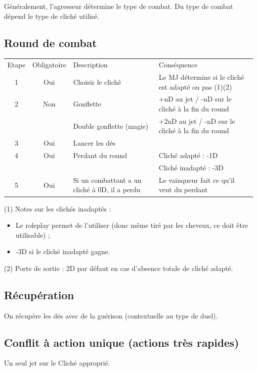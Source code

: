 \documentclass[a4paper, 11pt, twocolumn, twoside]{article}
\begin{document}
Généralement, l'agresseur détermine le type de combat. Du type de combat dépend le type de cliché utilisé.

\subsection{Round de combat}
\label{sec:orgfb0b9d7}

\begin{longtable}{c c p{3cm} p{3cm}}
Etape & Obligatoire & Description & Conséquence\\
1 & Oui & Choisir le cliché & Le MJ détermine si le cliché est adapté ou pas (1)(2)\\
2 & Non & Gonflette & +nD au jet / -nD sur le cliché à la fin du round\\
 &  & Double gonflette (magie) & +2nD au jet / -nD sur le cliché à la fin du round\\
3 & Oui & Lancer les dés & \\
4 & Oui & Perdant du round & Cliché adapté : -1D\\
 &  &  & Cliché inadapté : -3D\\
5 & Oui & Si un combattant a un cliché à 0D, il a perdu & Le vainqueur fait ce qu'il veut du perdant\\
\end{longtable}

(1) Notes sur les clichés inadaptés :
\begin{itemize}
\item Le roleplay permet de l'utiliser (donc même tiré par les cheveux, ce doit être utilisable) ;
\item -3D si le cliché inadapté gagne.
\end{itemize}

(2) Porte de sortie : 2D par défaut en cas d'absence totale de cliché adapté.

\subsection{Récupération}
\label{sec:org5d99df3}

On récupère les dés avec de la guérison (contextuelle au type de duel).

\subsection{Conflit à action unique (actions très rapides)}
\label{sec:orgda54926}

Un seul jet sur le Cliché approprié.
\end{document}
